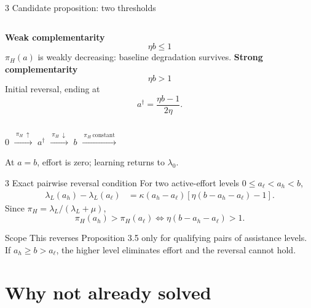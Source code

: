 \documentclass[aspectratio=169,11pt]{beamer}
\begin{document}
\begin{frame}{3 \textperiodcentered{} Candidate proposition: two thresholds}
  \begin{columns}[T]
      \textbf{Weak complementarity}
      \[
        \eta b\leq1
      \]
      $\pi_H(a)$ is weakly decreasing: baseline degradation survives.
      \textbf{Strong complementarity}
      \[
        \eta b>1
      \]
      Initial reversal, ending at
      \[
        \boxed{a^\dagger=\frac{\eta b-1}{2\eta}.}
      \]
  \end{columns}
  \vspace{0.8em}
  \begin{center}
    $0$ \quad $\xrightarrow{\ \pi_H\ \uparrow\ }$ \quad
    $a^\dagger$ \quad $\xrightarrow{\ \pi_H\ \downarrow\ }$ \quad
    $b$ \quad $\xrightarrow{\ \pi_H\ \text{constant}\ }$
  \end{center}
  \small At $a=b$, effort is zero; learning returns to $\lambda_0$.
\end{frame}

\begin{frame}{3 \textperiodcentered{} Exact pairwise reversal condition}
  For two active-effort levels $0\leq a_\ell<a_h<b$,
  \begin{align*}
    \lambda_L(a_h)-\lambda_L(a_\ell)
      &=\kappa(a_h-a_\ell)
        [\eta(b-a_h-a_\ell)-1].
  \end{align*}
  Since $\pi_H=\lambda_L/(\lambda_L+\mu)$,
  \[
    \boxed{
    \pi_H(a_h)>\pi_H(a_\ell)
    \iff
    \eta(b-a_h-a_\ell)>1.}
  \]
  \begin{alertblock}{Scope}
    This reverses Proposition 3.5 only for qualifying pairs of assistance
    levels. If $a_h\geq b>a_\ell$, the higher level eliminates effort and the
    reversal cannot hold.
  \end{alertblock}
\end{frame}

\section{Why not already solved}
\end{document}
